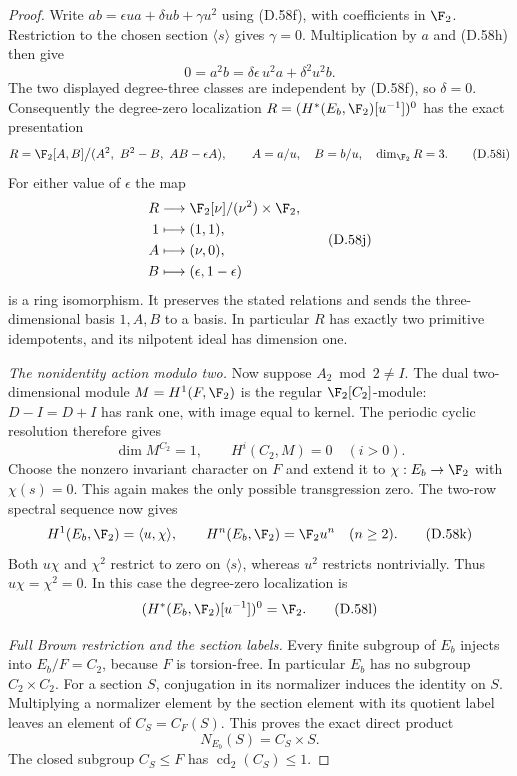 \begin{proof}
Write $ab=\epsilon ua+\delta ub+\gamma u^2$ using
(D.58f), with coefficients in $\F_2$.
Restriction to the chosen section $\langle s\rangle$
gives $\gamma=0$.
Multiplication by $a$ and (D.58h) then give
\[
           0=a^2b
             =\delta\epsilon\,u^2a+\delta^2u^2b .
\]
The two displayed degree-three classes are independent
by (D.58f), so $\delta=0$.
Consequently the degree-zero localization
$R=(H^*(E_b,\F_2)[u^{-1}])^0$ has the exact presentation
\[
 R=\F_2[A,B]\big/
       (A^2,\ B^2-B,\ AB-\epsilon A),\qquad
 A=a/u,\quad B=b/u,\quad \dim_{\F_2}R=3.                 \tag{D.58i}
\]
For either value of $\epsilon$ the map
\[
 \begin{split}
 R&\longrightarrow\F_2[\nu]/(\nu^2)\times\F_2,\\
 1&\longmapsto(1,1),\\
 A&\longmapsto(\nu,0),\\
 B&\longmapsto(\epsilon,1-\epsilon)
 \end{split}                                           \tag{D.58j}
\]
is a ring isomorphism.
It preserves the stated relations and sends the
three-dimensional basis $1,A,B$ to a basis.
In particular $R$ has exactly two primitive
idempotents, and its nilpotent ideal has dimension one.

\emph{The nonidentity action modulo two.}
Now suppose $A_2\bmod2\ne I$.
The dual two-dimensional module
$M=H^1(F,\F_2)$ is the regular $\F_2[C_2]$-module:
$D-I=D+I$ has rank one, with image equal to kernel.
The periodic cyclic resolution therefore gives
\[
       \dim M^{C_2}=1,\qquad H^i(C_2,M)=0\quad(i>0).
\]
Choose the nonzero invariant character on $F$ and
extend it to $\chi:E_b\to\F_2$ with $\chi(s)=0$.
This again makes the only possible transgression zero.
The two-row spectral sequence now gives
\[
 H^1(E_b,\F_2)=\langle u,\chi\rangle,\qquad
 H^n(E_b,\F_2)=\F_2u^n\quad(n\geq2).                    \tag{D.58k}
\]
Both $u\chi$ and $\chi^2$ restrict to zero on
$\langle s\rangle$, whereas $u^2$ restricts nontrivially.
Thus $u\chi=\chi^2=0$.
In this case the degree-zero localization is
\[
             (H^*(E_b,\F_2)[u^{-1}])^0=\F_2.             \tag{D.58l}
\]

\emph{Full Brown restriction and the section labels.}
Every finite subgroup of $E_b$ injects into $E_b/F=C_2$,
because $F$ is torsion-free.
In particular $E_b$ has no subgroup $C_2\times C_2$.
For a section $S$, conjugation in its normalizer
induces the identity on $S$.
Multiplying a normalizer element by the section
element with its quotient label leaves an element
of $C_S=C_F(S)$. This proves the exact direct product
\[
                         N_{E_b}(S)=C_S\times S.        \tag{D.58m}
\]
The closed subgroup $C_S\leq F$ has
$\operatorname{cd}_2(C_S)\leq1$.


\end{proof}
